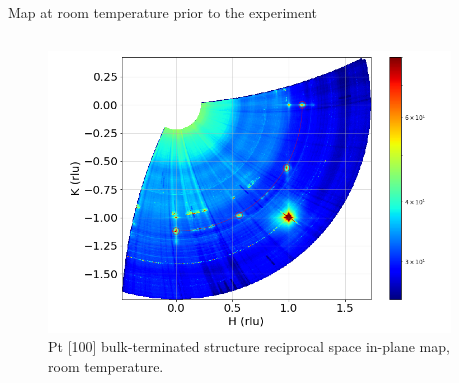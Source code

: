 \begin{frame}{Map at room temperature prior to the experiment}
    \begin{columns}
    

    
        \begin{figure}
        \centering
        \includegraphics[trim=0 0 40 0, clip, width=0.95\textwidth]{Figures/sxrd_data/maps/Map_hkl_surf_or_602-651.png}
        \caption{Pt [100] bulk-terminated structure reciprocal space in-plane map, room temperature.}
        \label{fig:ArgonRT}
    \end{figure}
        
    \end{columns}

\end{frame}